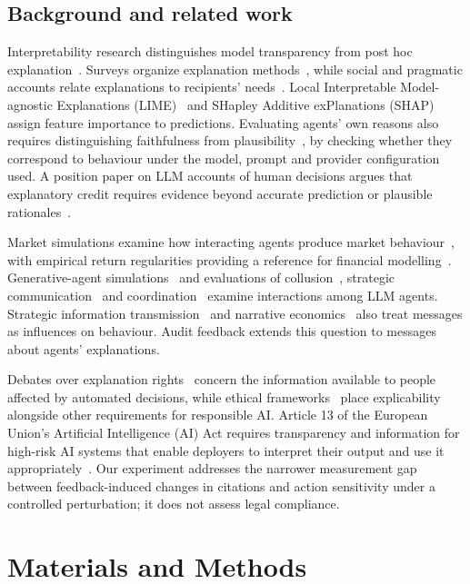 \documentclass[futureinternet,article,submit,moreauthors,pdftex]{Definitions/mdpi}
\begin{document}
\subsection{Background and related work}\label{sec:related}
Interpretability research distinguishes model transparency from post hoc explanation~\cite{rudin2019,lipton2018}. Surveys organize explanation methods~\cite{guidotti2018,samek2021,barredo2020}, while social and pragmatic accounts relate explanations to recipients' needs~\cite{miller2019,paez2019}. Local Interpretable Model-agnostic Explanations (LIME)~\cite{ribeiro2016} and SHapley Additive exPlanations (SHAP)~\cite{lundberg2017} assign feature importance to predictions. Evaluating agents' own reasons also requires distinguishing faithfulness from plausibility~\cite{jacovi2020}, by checking whether they correspond to behaviour under the model, prompt and provider configuration used. A position paper on LLM accounts of human decisions argues that explanatory credit requires evidence beyond accurate prediction or plausible rationales~\cite{lee2026}.

Market simulations examine how interacting agents produce market behaviour~\cite{chen2025,evans2023}, with empirical return regularities providing a reference for financial modelling~\cite{cont2001}. Generative-agent simulations~\cite{park2023} and evaluations of collusion~\cite{collusion2025}, strategic communication~\cite{snake2026} and coordination~\cite{byzantine2026} examine interactions among LLM agents. Strategic information transmission~\cite{crawford1982} and narrative economics~\cite{shiller2019} also treat messages as influences on behaviour. Audit feedback extends this question to messages about agents' explanations.

Debates over explanation rights~\cite{wachter2017} concern the information available to people affected by automated decisions, while ethical frameworks~\cite{floridi2018} place explicability alongside other requirements for responsible AI. Article 13 of the European Union's Artificial Intelligence (AI) Act requires transparency and information for high-risk AI systems that enable deployers to interpret their output and use it appropriately~\cite{ai_act_2024}. Our experiment addresses the narrower measurement gap between feedback-induced changes in citations and action sensitivity under a controlled perturbation; it does not assess legal compliance.

\section{Materials and Methods}\label{sec:methods}
\end{document}

